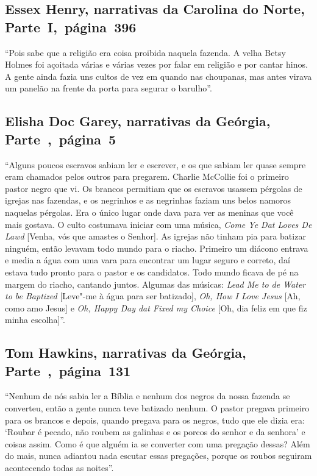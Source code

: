 \subsection{Essex Henry, narrativas da Carolina do Norte, Parte~I,~página~396}
\label{ref137}

``Pois sabe que a religião era coisa proibida naquela fazenda. A velha
Betsy Holmes foi açoitada várias e várias vezes por falar em religião e
por cantar hinos. A gente ainda fazia uns cultos de vez em quando nas
choupanas, mas antes virava um panelão na frente da porta para segurar o
barulho''.

\subsection{Elisha Doc Garey, narrativas da Geórgia, Parte~,~página~5} \label{ref100}

``Alguns poucos escravos sabiam ler e escrever, e os que sabiam ler
quase sempre eram chamados pelos outros para pregarem. Charlie McCollie
foi o primeiro pastor negro que vi. Os brancos permitiam que os escravos
usassem pérgolas de igrejas nas fazendas, e os negrinhos e as negrinhas
faziam uns belos namoros naquelas pérgolas. Era o único lugar onde dava
para ver as meninas que você mais gostava. O culto costumava iniciar com
uma música, \emph{Come Ye Dat Loves De Lawd} {[}Venha, vós que amastes o
Senhor{]}. As igrejas não tinham pia para batizar ninguém, então
levavam todo mundo para o riacho. Primeiro um diácono entrava e media a
água com uma vara para encontrar um lugar seguro e correto, daí estava
tudo pronto para o pastor e os candidatos. Todo mundo ficava de pé na
margem do riacho, cantando juntos. Algumas das músicas: \emph{Lead Me to de
Water to be Baptized} {[}Leve"-me à água para ser batizado{]}, \emph{Oh, How
I Love Jesus} {[}Ah, como amo Jesus{]} e \emph{Oh, Happy Day dat Fixed my
Choice} {[}Oh, dia feliz em que fiz minha escolha{]}''.

\subsection{Tom Hawkins, narrativas da Geórgia, Parte~,~página~131}
\label{ref128}

``Nenhum de nós sabia ler a Bíblia e nenhum dos negros da nossa fazenda
se converteu, então a gente nunca teve batizado nenhum. O pastor pregava
primeiro para os brancos e depois, quando pregava para os negros, tudo
que ele dizia era: `Roubar é pecado, não roubem as galinhas e os porcos
do senhor e da senhora' e coisas assim. Como é que alguém ia se
converter com uma pregação dessas? Além do mais, nunca adiantou nada
escutar essas pregações, porque os roubos seguiram acontecendo todas as
noites''.

